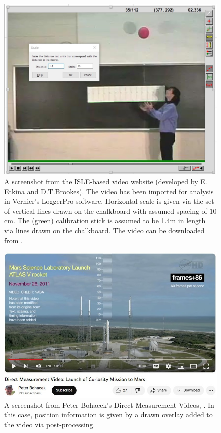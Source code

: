 \documentclass[12pt]{iopart}
\begin{document}
\begin{figure}[h]
\centering
\includegraphics[width=\columnwidth]{figure_1_Etkina-calibration.jpg}
\caption{ 
A screenshot from the ISLE-based video website (developed by E. Etkina and D.T.Brookes).
The video has been imported for analysis in Vernier's LoggerPro software.    
Horizontal  scale is given via the set of vertical lines drawn on the chalkboard with assumed spacing of $10$cm. 
The (green) calibration stick is assumed to be 1.4m in length via lines drawn on the chalkboard.  The video can be downloaded from \cite{ISLE_ball_video_source} .
}
\label{Etkina-calibration}
\end{figure}

\begin{figure}[h]
\centering
\includegraphics[width=\columnwidth]{figure_2_Bohacek-1.jpg}
\caption{A screenshot from Peter Bohacek's Direct Measurement Videos, \cite{Bohacek_youtube_intro}. In this case, position information is given by a drawn overlay added to the video via post-processing.
}
\label{Bohacek-1}
\end{figure}
\end{document}
